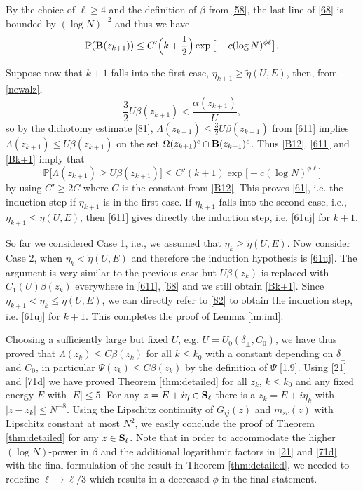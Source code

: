 \documentclass[draft]{article}
\newcommand{\wt}{\widetilde}
\newcommand{\al}{\alpha}
\newcommand{\be}{\begin{equation}}
\newcommand{\ee}{\end{equation}}
\renewcommand{\P}{{\mathbb P}}
\newcommand{\bS}{ {\bf  S}}
\newcommand{\qed}{\hfill\fbox{}\par\vspace{0.3mm}}
\numberwithin{equation}{section}
\numberwithin{theorem}{section}
\numberwithin{definition}{section}
\numberwithin{remark}{section}
\begin{document}
By the choice of $\ell\ge 4$ and the definition of $\beta$ from 
\eqref{58},  the last line of \eqref{68}
 is bounded by $   (\log N)^{-2}$ and thus we have 
\be\label{Bk+1}
\P ( {\bf B}(z_{k+1})) \le C'\Big(k+\frac{1}{2}\Big)\exp{\big[-c(\log N)^{\phi \ell} \big]}.
\ee



Suppose now that $k+1$ falls into the first case,
$\eta_{k+1}\ge \wt\eta(U,E)$, then, from \eqref{newalz},
$$
   \frac{3}{2} U\beta(z_{k+1})<\frac{\al(z_{k+1})}{U},
$$
so by the dichotomy estimate \eqref{81}, $\Lambda(z_{k+1})\le
\frac{3}{2}U\beta(z_{k+1})$  from \eqref{611} implies  $\Lambda(z_{k+1})\le
U\beta(z_{k+1})$ on the set $\Omega(z_{k+1})^c\cap {\bf B}(z_{k+1})^c$.
Thus \eqref{B12}, \eqref{611} and \eqref{Bk+1} imply that
\be\label{612}
\P \bigg [     \Lambda (z_{k+1})  \ge  U \beta(z_{k+1})
\bigg ] \le C'(k+1)\exp{\big[-c(\log N)^{\phi \ell} \big]}
\ee  
by using $C'\ge 2C$ where $C$ is the constant from \eqref{B12}.
This proves  \eqref{61}, i.e.  the induction step
if $\eta_{k+1}$ is in the first case.
If $\eta_{k+1}$ falls into  the second case, i.e.,  $\eta_{k+1}\le \wt\eta(U,E)$, 
then \eqref{611} gives directly the
induction step, i.e. \eqref{61uj} for $k+1$.


So far we considered Case 1, i.e., we assumed that $\eta_k\ge \wt\eta(U,E)$. Now consider
Case 2, when  $\eta_k< \wt\eta(U,E)$ and therefore the induction hypothesis is
\eqref{61uj}. The argument is very similar to the previous case
but $U\beta(z_k)$ is replaced with $C_1(U)\beta(z_k)$ everywhere in  
 \eqref{611}, \eqref{68} and we   still obtain \eqref{Bk+1}.
Since $\eta_{k+1} <\eta_k\le \wt\eta(U,E)$, we can
directly refer  to \eqref{82} to obtain the
induction step, i.e. \eqref{61uj} for $k+1$. This completes the proof
of Lemma \ref{lm:ind}. \qed


\medskip

Choosing a sufficiently  large but fixed $U$, e.g. $U=U_0(\delta_\pm, C_0)$, 
we have thus proved that $\Lambda(z_k) \le C\beta(z_k)$  for all  $k\le k_0$
with a constant depending on $\delta_\pm$ and $C_0$, 
in particular $\Psi(z_k)\le C\beta(z_k)$ by the definition of $\Psi$ \eqref{1.9}.
Using \eqref{21} and \eqref{71d} 
 we have proved  Theorem \ref{thm:detailed} for all $z_k$, $k\le k_0$ and 
any fixed energy $E$  with $|E| \le 5$. 
 For any $z=E+i\eta\in \bS_\ell$
there is a $z_k =E+i\eta_k$ with $|z-z_k|\le N^{-8}$. Using the
Lipschitz continuity of $G_{ij}(z)$ and $m_{sc}(z)$ with Lipschitz
constant at most $N^2$, we easily conclude the proof of Theorem \ref{thm:detailed}
for  any $z\in \bS_\ell$.  Note that in order to accommodate the higher 
$(\log N)$-power in $\beta$ and the additional logarithmic factors
in  \eqref{21} and \eqref{71d}
 with the final formulation of the result in Theorem \ref{thm:detailed},
 we needed to redefine $\ell \to \ell/3$ which results
in a decreased $\phi$ in the final statement.
\qed
\end{document}
